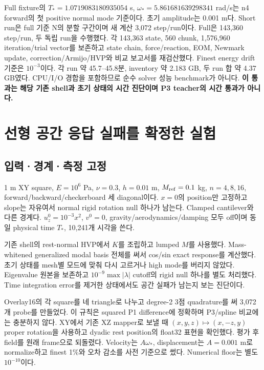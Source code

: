 \documentclass[10pt]{article}
\begin{document}
Full fixture의 \(T_*=1.0719083180935054\) s,
\(\omega_*=5.861681639298341\) rad/s는 n4 forward의 첫 positive normal mode 기준이다.
초기 amplitude는 0.001 m다. Short run은 full 기준 N의 분할 구간이며 새 계산 3,072 step/run이다.
Full은 143,360 step/run, 두 독립 run을 수행했다. 각 143,363 state, 560 chunk,
1,576,960 iteration/trial vector를 보존하고 state chain, force/reaction, EOM, Newmark update,
correction/Armijo/HVP와 비교 보고서를 재검산했다. Finest energy drift 기준은 \(10^{-3}\)이다.
각 run 약 45.7--45.8분, inventory 약 2.183 GB, 두 run 합 약 4.37 GB였다.
CPU/I/O 경합을 포함하므로 순수 solver 성능 benchmark가 아니다.
\textbf{이 통과는 해당 기존 shell과 초기 상태의 시간 진단이며 P3 teacher의 시간 통과가 아니다.}

\section{선형 공간 응답 실패를 확정한 실험}

\subsection{입력·경계·측정 고정}

1 m XY square, \(E=10^6\) Pa, \(\nu=0.3\), \(h=0.01\) m,
\(M_{\rm ref}=0.1\) kg, \(n=4,8,16\), forward/backward/checkerboard 세 diagonal이다.
\(x=0\)의 position만 고정하고 slope는 자유여서 normal rigid rotation null 하나가 남는다.
Clamped cantilever와 다른 경계다. \(u_z^0=10^{-3}x^2\), \(v^0=0\),
gravity/aerodynamics/damping 모두 off이며 동일 physical time \(T_*\), 10,241개 시각을 쓴다.

기존 shell의 rest-normal HVP에서 \(K\)를 조립하고 lumped \(M\)를 사용했다.
Mass-whitened generalized modal basis 전체를 써서 cos/sin exact response를 계산했다.
초기 상태를 mesh별 모드에 맞춰 다시 고르거나 high mode를 버리지 않았다.
Eigenvalue 원본을 보존하고 \(10^{-9}\max|\lambda|\) cutoff의 rigid null 하나를 별도 처리했다.
Time integration error를 제거한 상태에서도 공간 실패가 남는지 보는 진단이다.

Overlay16의 각 square를 네 triangle로 나누고 degree-2 3점 quadrature를 써 3,072개 probe를 만들었다.
이 규칙은 squared P1 difference에 정확하며 P3/spline 비교에는 충분하지 않다.
XY에서 기존 XZ mapper로 보낼 때 \((x,y,z)\mapsto(x,-z,y)\) proper rotation을 사용하고
dyadic rest position의 float32 표현을 확인했다. 평가 후 field를 원래 frame으로 되돌렸다.
Velocity는 \(A\omega_*\), displacement는 \(A=0.001\) m로 normalize하고 finest 1\%와
오차 감소를 사전 기준으로 썼다. Numerical floor는 별도 \(10^{-10}\)이다.
\end{document}
